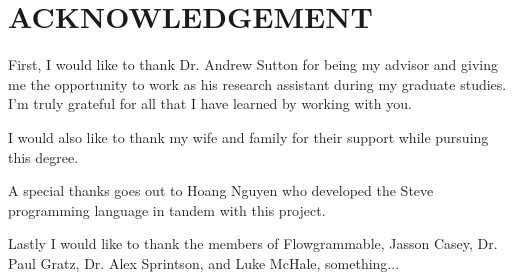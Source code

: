\chapter*{ACKNOWLEDGEMENT}

First, I would like to thank Dr. Andrew Sutton for being my advisor and giving
me the opportunity to work as his research assistant during my graduate studies.
I'm truly grateful for all that I have learned by working with you.

I would also like to thank my wife and family for their support while pursuing
this degree.

A special thanks goes out to Hoang Nguyen who developed the Steve programming
language in tandem with this project.

Lastly I would like to thank the members of Flowgrammable, Jasson Casey, Dr.
Paul Gratz, Dr. Alex Sprintson, and Luke McHale, something...
